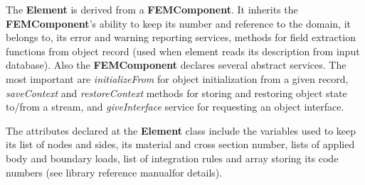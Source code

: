 \documentclass[a4paper]{article}
\newcommand{\class}[1]{{\bf #1}}
\newcommand{\service}[1]{{\em #1}}
\newcommand{\refman}{\oofem library reference manual}
\begin{document}
The \class{Element} is derived from a \class{FEMComponent}. It inherits
the \class{FEMComponent}'s ability to keep its number and reference
to the domain, it belongs to, its error and warning
reporting services, methods for field extraction functions from object
record (used when element reads its description from input database).
Also the \class{FEMComponent} declares several abstract services. The most
important are \service{initializeFrom} for object
initialization from a given record, \service{saveContext} and
\service{restoreContext} methods for storing and restoring object state
to/from a stream, and \service{giveInterface} service for requesting
an object interface.

The attributes declared at the \class{Element} class include the 
variables used to keep its list of nodes and sides, its material
and cross section number, lists of applied body and boundary loads,
list of integration rules and array storing its code numbers
(see \refman for details).
\end{document}
